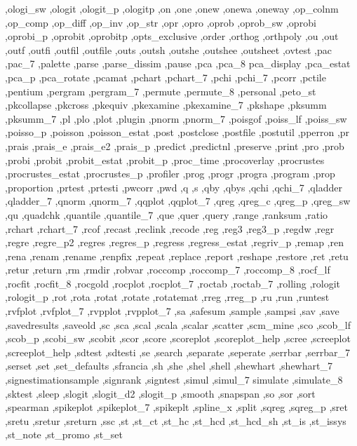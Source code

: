{{    ,ologi_sw ,ologit ,ologit_p ,ologitp ,on ,one ,onew ,onewa ,oneway
    ,op_colnm ,op_comp ,op_diff ,op_inv ,op_str ,opr ,opro ,oprob
    ,oprob_sw ,oprobi ,oprobi_p ,oprobit ,oprobitp ,opts_exclusive
    ,order ,orthog ,orthpoly ,ou ,out ,outf ,outfi ,outfil ,outfile
    ,outs ,outsh ,outshe ,outshee ,outsheet ,ovtest ,pac ,pac_7 ,palette
    ,parse ,parse_dissim ,pause ,pca ,pca_8 pca_display ,pca_estat
    ,pca_p ,pca_rotate ,pcamat ,pchart ,pchart_7 ,pchi ,pchi_7 ,pcorr
    ,pctile ,pentium ,pergram ,pergram_7 ,permute ,permute_8 ,personal
    ,peto_st ,pkcollapse ,pkcross ,pkequiv ,pkexamine ,pkexamine_7
    ,pkshape ,pksumm ,pksumm_7 ,pl ,plo ,plot ,plugin ,pnorm ,pnorm_7
    ,poisgof ,poiss_lf ,poiss_sw ,poisso_p ,poisson ,poisson_estat
    ,post ,postclose ,postfile ,postutil ,pperron ,pr ,prais ,prais_e
    ,prais_e2 ,prais_p ,predict ,predictnl ,preserve ,print ,pro ,prob
    ,probi ,probit ,probit_estat ,probit_p ,proc_time ,procoverlay
    ,procrustes ,procrustes_estat ,procrustes_p ,profiler ,prog ,progr
    ,progra ,program ,prop ,proportion ,prtest ,prtesti ,pwcorr ,pwd
    ,q ,s ,qby ,qbys ,qchi ,qchi_7 ,qladder ,qladder_7 ,qnorm ,qnorm_7
    ,qqplot ,qqplot_7 ,qreg ,qreg_c ,qreg_p ,qreg_sw ,qu ,quadchk
    ,quantile ,quantile_7 ,que ,quer ,query ,range ,ranksum ,ratio
    ,rchart ,rchart_7 ,rcof ,recast ,reclink ,recode ,reg ,reg3
    ,reg3_p ,regdw ,regr ,regre ,regre_p2 ,regres ,regres_p ,regress
    ,regress_estat ,regriv_p ,remap ,ren ,rena ,renam ,rename ,renpfix
    ,repeat ,replace ,report ,reshape ,restore ,ret ,retu ,retur ,return
    ,rm ,rmdir ,robvar ,roccomp ,roccomp_7 ,roccomp_8 ,rocf_lf ,rocfit
    ,rocfit_8 ,rocgold ,rocplot ,rocplot_7 ,roctab ,roctab_7 ,rolling
    ,rologit ,rologit_p ,rot ,rota ,rotat ,rotate ,rotatemat ,rreg
    ,rreg_p ,ru ,run ,runtest ,rvfplot ,rvfplot_7 ,rvpplot ,rvpplot_7
    ,sa ,safesum ,sample ,sampsi ,sav ,save ,savedresults ,saveold ,sc
    ,sca ,scal ,scala ,scalar ,scatter ,scm_mine ,sco ,scob_lf ,scob_p
    ,scobi_sw ,scobit ,scor ,score ,scoreplot ,scoreplot_help ,scree
    ,screeplot ,screeplot_help ,sdtest ,sdtesti ,se ,search ,separate
    ,seperate ,serrbar ,serrbar_7 ,serset ,set ,set_defaults ,sfrancia
    ,sh ,she ,shel ,shell ,shewhart ,shewhart_7 ,signestimationsample
    ,signrank ,signtest ,simul ,simul_7 simulate ,simulate_8 ,sktest
    ,sleep ,slogit ,slogit_d2 ,slogit_p ,smooth ,snapspan ,so ,sor
    ,sort ,spearman ,spikeplot ,spikeplot_7 ,spikeplt ,spline_x ,split
    ,sqreg ,sqreg_p ,sret ,sretu ,sretur ,sreturn ,ssc ,st ,st_ct ,st_hc
    ,st_hcd ,st_hcd_sh ,st_is ,st_issys ,st_note ,st_promo ,st_set
}}
